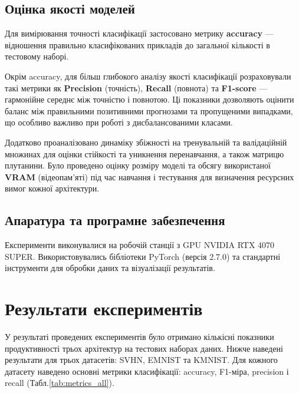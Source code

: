 \documentclass[14pt,a4paper]{extarticle}
\begin{document}
\subsection{Оцінка якості моделей}
Для вимірювання точності класифікації застосовано метрику \textbf{accuracy} — відношення правильно класифікованих прикладів до загальної кількості в тестовому наборі.

Окрім accuracy, для більш глибокого аналізу якості класифікації розраховували такі метрики як \textbf{Precision} (точність), \textbf{Recall} (повнота) та \textbf{F1-score} — гармонійне середнє між точністю і повнотою. Ці показники дозволяють оцінити баланс між правильними позитивними прогнозами та пропущеними випадками, що особливо важливо при роботі з дисбалансованими класами.

Додатково проаналізовано динаміку збіжності на тренувальній та валідаційній множинах для оцінки стійкості та уникнення перенавчання, а також матрицю плутанини. Було проведено оцінку розміру моделі та обсягу використаної \textbf{VRAM} (відеопам'яті) під час навчання і тестування для визначення ресурсних вимог кожної архітектури.

\subsection{Апаратура та програмне забезпечення}
Експерименти виконувалися на робочій станції з GPU NVIDIA RTX 4070 SUPER. Використовувались бібліотеки PyTorch (версія 2.7.0) та стандартні інструменти для обробки даних та візуалізації результатів.



\section{Результати експериментів}  
\label{sec:results}

У результаті проведених експериментів було отримано кількісні показники продуктивності трьох архітектур на тестових наборах даних. Нижче наведені результати для трьох датасетів: SVHN, EMNIST та KMNIST. Для кожного датасету наведено основні метрики класифікації: accuracy, F1-міра, precision і recall (Табл.\ref{tab:metrics_all}).
\end{document}
